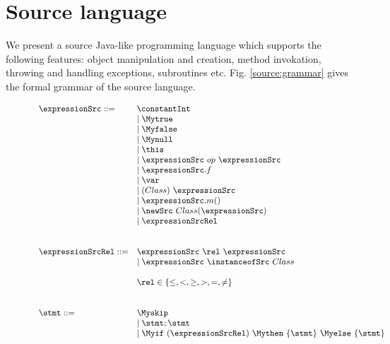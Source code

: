 
\newtheorem{Expression}{Definition}[section]
\newtheorem{ExpressionRel}[Expression]{Definition}
\newtheorem{Statement}[Expression]{Definition}

\section{Source language} \label{source}


We present a source Java-like programming language which supports the following features:
object manipulation and creation, method invokation, throwing and handling exceptions, subroutines etc. Fig. \ref{source:grammar} gives the formal grammar of the source language.
\begin{figure}[ht!] 
\begin{frameit}
   $$ \begin{array} {ll}    
     \expressionSrc ::=         & \constantInt  \\
				& \mid \Mytrue \\ 
				& \mid \Myfalse \\
				& \mid \Mynull  \\
				& \mid \this \\
				& \mid \expressionSrc \ op \ \expressionSrc \\  
				& \mid \expressionSrc.f \\
				& \mid \var \\
  			        & \mid (Class) \ \expressionSrc \\
				& \mid \expressionSrc.m( ) \\
				& \mid  \newSrc \ Class  ( \expressionSrc  ) \\ 
				& \mid \expressionSrcRel \\
                                & \\
				& \\
     \expressionSrcRel ::=      & \expressionSrc \ \rel \ \expressionSrc \\
				& \mid \expressionSrc \ \instanceofSrc \ Class\\
				& \\   
				& \rel \in \{ \le, < ,  \ge, >, = , \neq \}      \\
				& \\
				& \\
      \stmt ::=		        & \Myskip \\
                                & \mid \stmt;\stmt \\
                                & \mid \Myif \ (\expressionSrcRel) \ \Mythen \ \{ \stmt \} \  \Myelse \ \{ \stmt \}  \\

\end{array}$$
\end{frameit}
\end{figure}
